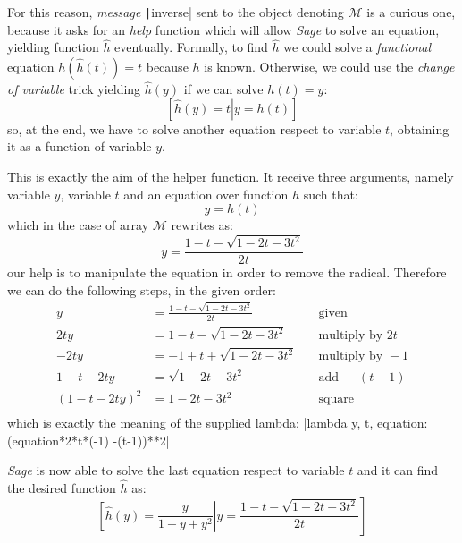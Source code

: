 For this reason, \emph{message} \texttt|inverse| sent to the object
denoting $\mathcal{M}$ is a curious one, because it asks for an \emph{help}
function which will allow \emph{Sage} to solve an equation, yielding function
$\hat{h}$ eventually. Formally, to find $\hat{h}$ we could solve a
\emph{functional} equation $h(\hat{h}(t))=t$ because $h$ is known.  Otherwise,
we could use the \emph{change of variable} trick yielding $\hat{h}(y)$ if we
can solve $h(t)=y$: 
\begin{displaymath}
    \left.\left[\hat{h}(y)=t\right|y=h(t)\right]
\end{displaymath}
so, at the end, we have to solve another equation respect to 
variable $t$, obtaining it as a function of variable $y$.

This is exactly the aim of the helper function. It receive three arguments, 
namely variable $y$, variable $t$ and an equation over function $h$ such that:
\begin{displaymath}
    y=h(t)
\end{displaymath}
which in the case of array $\mathcal{M}$ rewrites as:
\begin{displaymath}
    y=\frac{1-t-\sqrt{1-2t-3t^{2}}}{2t}
\end{displaymath}
our help is to manipulate the equation in order to remove the radical. Therefore
we can do the following steps, in the given order:
\begin{displaymath}
    \begin{split}
        y&=\frac{1-t-\sqrt{1-2t-3t^{2}}}{2t} &\quad\text{given}\\
        2ty &=1-t-\sqrt{1-2t-3t^{2}} &\quad\text{multiply by } 2t\\
        -2ty &=-1+t+\sqrt{1-2t-3t^{2}} &\quad\text{multiply by } -1\\
        1-t-2ty &=\sqrt{1-2t-3t^{2}} &\quad\text{add } -(t-1)\\
        \left(1-t-2ty\right)^{2} &=1-2t-3t^{2} &\quad\text{square}\\
    \end{split}
\end{displaymath}
which is exactly the meaning of the supplied lambda: |lambda y, t,
equation: (equation*2*t*(-1) -(t-1))**2| 

\emph{Sage} is now able to solve the last equation respect to variable $t$ and it
can find the desired function $\hat{h}$ as:
\begin{displaymath}
    \left.\left[\hat{h}(y)=\frac{y}{1+y+y^{2}}\right|
        y=\frac{1-t-\sqrt{1-2t-3t^{2}}}{2t} \right]
\end{displaymath}

